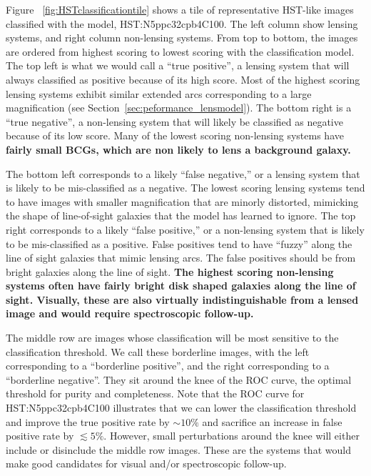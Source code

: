 \documentclass{emulateapj}
\newcommand{\todo}[1]{{\bf\color{blue} #1}}
\def\lsim{\lesssim}
\begin{document}
Figure ~\ref{fig:HSTclassificationtile} shows a tile of representative
HST-like images classified with the model, HST:N5ppc32cpb4C100.  The
left column show lensing systems, and right column non-lensing
systems.  From top to bottom, the images are ordered from highest
scoring to lowest scoring with the classification model.  The top left
is what we would call a ``true positive'', a lensing system that will
always classified as positive because of its high score.  Most of the
highest scoring lensing systems exhibit similar extended arcs
corresponding to a large magnification (see
Section~\ref{sec:peformance_lensmodel}).  The bottom right is a ``true
negative'', a non-lensing system that will likely be classified as
negative because of its low score.  Many of the lowest scoring
non-lensing systems have \todo{fairly small BCGs, which are non likely
  to lens a background galaxy.}

The bottom left corresponds to a likely ``false negative,'' or a
lensing system that is likely to be mis-classified as a negative.  The
lowest scoring lensing systems tend to have images with smaller
magnification that are minorly distorted, mimicking the shape of
line-of-sight galaxies that the model has learned to ignore.  The top
right corresponds to a likely ``false positive,'' or a non-lensing
system that is likely to be mis-classified as a positive.  False
positives tend to have ``fuzzy'' along the line of sight galaxies that
mimic lensing arcs.  The false positives should be from bright
galaxies along the line of sight.  \todo{The highest scoring
  non-lensing systems often have fairly bright disk shaped galaxies
  along the line of sight.  Visually, these are also virtually
  indistinguishable from a lensed image and would require
  spectroscopic follow-up.}

The middle row are images whose classification will be most sensitive
to the classification threshold.  We call these borderline images,
with the left corresponding to a ``borderline positive'', and the
right corresponding to a ``borderline negative''.  They sit around the
knee of the ROC curve, the optimal threshold for purity and
completeness.  Note that the ROC curve for HST:N5ppc32cpb4C100
illustrates that we can lower the classification threshold and improve
the true positive rate by $\sim10\%$ and sacrifice an increase in
false positive rate by $\lsim5\%$.  However, small perturbations
around the knee will either include or disinclude the middle row
images.  These are the systems that would make good candidates for
visual and/or spectroscopic follow-up.
\end{document}
